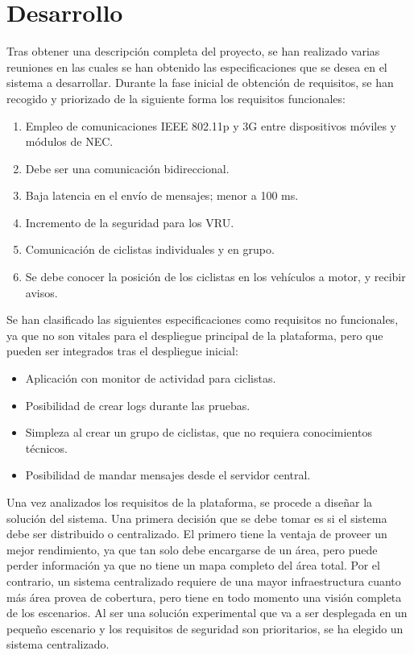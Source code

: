\chapter{Desarrollo}\label{cha:desarrollo}
Tras obtener una descripción completa del proyecto, se han realizado varias reuniones en las cuales se han obtenido las especificaciones que se desea en el sistema a desarrollar. Durante la fase inicial de obtención de requisitos, se han recogido y priorizado de la siguiente forma los requisitos funcionales:
\begin{enumerate}
	\item Empleo de comunicaciones IEEE 802.11p y 3G entre dispositivos móviles y módulos de NEC.
	\item Debe ser una comunicación bidireccional.
	\item Baja latencia en el envío de mensajes; menor a 100 ms.
	\item Incremento de la seguridad para los VRU.
	\item Comunicación de ciclistas individuales y en grupo.
	\item Se debe conocer la posición de los ciclistas en los vehículos a motor, y recibir avisos.
\end{enumerate}

Se han clasificado las siguientes especificaciones como requisitos no funcionales, ya que no son vitales para el despliegue principal de la plataforma, pero que pueden ser integrados tras el despliegue inicial:
\begin{itemize}
	\item Aplicación con monitor de actividad para ciclistas.
	\item Posibilidad de crear logs durante las pruebas.
	\item Simpleza al crear un grupo de ciclistas, que no requiera conocimientos técnicos.
	\item Posibilidad de mandar mensajes desde el servidor central.
\end{itemize}

Una vez analizados los requisitos de la plataforma, se procede a diseñar la solución del sistema. Una primera decisión que se debe tomar es si el sistema debe ser distribuido o centralizado. El primero tiene la ventaja de proveer un mejor rendimiento, ya que tan solo debe encargarse de un área, pero puede perder información ya que no tiene un mapa completo del área total. Por el contrario, un sistema centralizado requiere de una mayor infraestructura cuanto más área provea de cobertura, pero tiene en todo momento una visión completa de los escenarios. Al ser una solución experimental que va a ser desplegada en un pequeño escenario y los requisitos de seguridad son prioritarios, se ha elegido un sistema centralizado.

